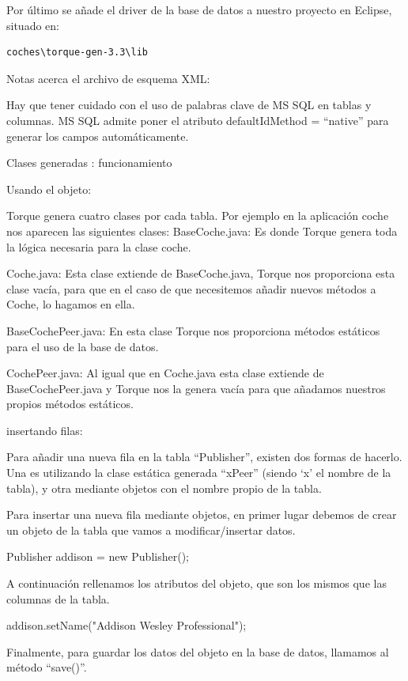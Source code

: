 \documentclass[12pt, oneside]{article}
\begin{document}

Por último se añade el driver de la base de datos a nuestro proyecto en Eclipse, situado en:

\begin{lstlisting}
coches\torque-gen-3.3\lib
\end{lstlisting}

Notas acerca el archivo de esquema XML:

Hay que tener cuidado con el uso de palabras clave de MS SQL en tablas y columnas. 
MS SQL admite poner el atributo defaultIdMethod = “native” para generar los campos automáticamente.

Clases generadas : funcionamiento

Usando el objeto:

Torque genera cuatro clases por cada tabla. Por ejemplo en la aplicación coche nos aparecen las siguientes clases:
BaseCoche.java: Es donde Torque genera toda la lógica necesaria para la clase coche.

Coche.java: Esta clase extiende de BaseCoche.java, Torque nos proporciona esta clase vacía, para que en el caso de que necesitemos añadir nuevos métodos a Coche, lo hagamos en ella.

BaseCochePeer.java: En esta clase Torque nos proporciona métodos estáticos para el uso de la base de datos.

CochePeer.java: Al igual que en Coche.java esta clase extiende de BaseCochePeer.java y Torque nos la genera vacía para que añadamos nuestros propios métodos estáticos.

insertando filas:

Para añadir una nueva fila en la tabla “Publisher”, existen dos formas de hacerlo. Una es utilizando la clase estática generada “xPeer” (siendo ‘x’ el nombre de la tabla), y otra mediante objetos con el nombre propio de la tabla.




Para insertar una nueva fila mediante objetos, en primer lugar debemos de crear un objeto de la tabla que vamos a modificar/insertar datos.

Publisher addison = new Publisher();

A continuación rellenamos los atributos del objeto, que son los mismos que las columnas de la tabla.

addison.setName("Addison Wesley Professional");

Finalmente, para guardar los datos del objeto en la base de datos, llamamos al método “save()”.
\end{document}
